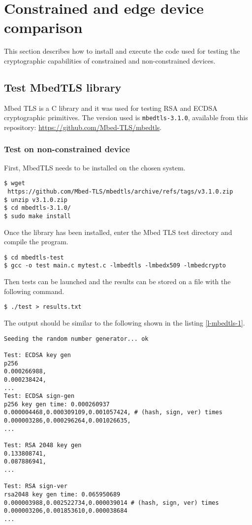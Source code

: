 
\section{Constrained and edge device comparison}
This section describes how to install and execute the code used for testing the cryptographic capabilities of constrained and non-constrained devices.
\subsection{Test MbedTLS library}
Mbed TLS \cite{mbed-tls} is a C library and it was used for testing RSA and ECDSA cryptographic primitives. The version used is \texttt{mbedtls-3.1.0}, available from this repository: \url{https://github.com/Mbed-TLS/mbedtls}. 

\subsubsection{Test on non-constrained device}
First, MbedTLS needs to be installed on the chosen system. \\
\begin{lstlisting}[frame=single]
$ wget 
 https://github.com/Mbed-TLS/mbedtls/archive/refs/tags/v3.1.0.zip
$ unzip v3.1.0.zip
$ cd mbedtls-3.1.0/
$ sudo make install
\end{lstlisting}
Once the library has been installed, enter the Mbed TLS test directory and compile the program.  \\
\begin{lstlisting}[frame=single]
$ cd mbedtls-test
$ gcc -o test main.c mytest.c -lmbedtls -lmbedx509 -lmbedcrypto
\end{lstlisting}
Then tests can be launched and the results can be stored on a file with the following command. \\
\begin{lstlisting}[frame=single]
$ ./test > results.txt
\end{lstlisting}
The output should be similar to the following shown in the listing \ref{l-mbedtls-1}. \\
\begin{lstlisting}[caption={Example of MbedTLS tests output on non-constrained device},captionpos=b,label={l-mbedtls-1},style=DOS,frame=single]
Seeding the random number generator... ok

Test: ECDSA key gen
p256
0.000266988,
0.000238424,
...
Test: ECDSA sign-gen
p256 key gen time: 0.000260937
0.000004468,0.000309109,0.001057424, # (hash, sign, ver) times
0.000003286,0.000296264,0.001026635,
...

Test: RSA 2048 key gen
0.133808741,
0.087886941,
...

Test: RSA sign-ver
rsa2048 key gen time: 0.065950689
0.000003988,0.002522734,0.000039014 # (hash, sign, ver) times
0.000003206,0.001853610,0.000038684
...
\end{lstlisting}

